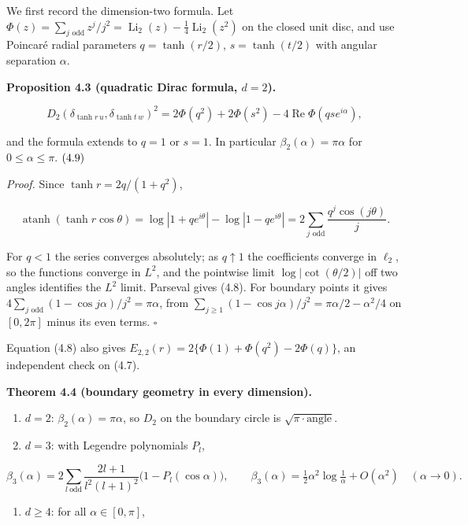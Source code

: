 \documentclass[
  british,
  11pt,
  a4paper,
]{article}
\providecommand{\tightlist}{%
  \setlength{\itemsep}{0pt}\setlength{\parskip}{0pt}}
\begin{document}
We first record the dimension-two formula. Let
\(\Phi(z)=\sum_{j\text{ odd}}z^j/j^2=\operatorname{Li}_2(z)-\tfrac14\operatorname{Li}_2(z^2)\)
on the closed unit disc, and use Poincaré radial parameters
\(q=\tanh(r/2)\), \(s=\tanh(t/2)\) with angular separation \(\alpha\).

\textbf{Proposition 4.3 (quadratic Dirac formula, \(d=2\)).}

\[
D_2(\delta_{\tanh r\,u},\delta_{\tanh t\,w})^2
=2\Phi(q^2)+2\Phi(s^2)-4\operatorname{Re}\Phi(qs e^{i\alpha}),
\tag{4.8}
\]

and the formula extends to \(q=1\) or \(s=1\). In particular
\(\beta_2(\alpha)=\pi\alpha\) for \(0\leq\alpha\leq\pi\).
\(\hfill(4.9)\)

\emph{Proof.} Since \(\tanh r=2q/(1+q^2)\),

\[
\operatorname{atanh}(\tanh r\cos\theta)
=\log|1+qe^{i\theta}|-\log|1-qe^{i\theta}|
=2\sum_{j\text{ odd}}\frac{q^j\cos(j\theta)}j.
\tag{4.10}
\]

For \(q<1\) the series converges absolutely; as \(q\uparrow1\) the
coefficients converge in \(\ell_2\), so the functions converge in
\(L^2\), and the pointwise limit \(\log|\cot(\theta/2)|\) off two angles
identifies the \(L^2\) limit. Parseval gives (4.8). For boundary points
it gives \(4\sum_{j\text{ odd}}(1-\cos j\alpha)/j^2=\pi\alpha\), from
\(\sum_{j\geq1}(1-\cos j\alpha)/j^2=\pi\alpha/2-\alpha^2/4\) on
\([0,2\pi]\) minus its even terms. \(\square\)

Equation (4.8) also gives
\(E_{2,2}(r)=2\{\Phi(1)+\Phi(q^2)-2\Phi(q)\}\), an independent check on
(4.7).

\textbf{Theorem 4.4 (boundary geometry in every dimension).}

\begin{enumerate}
\def\labelenumi{(\roman{enumi})}
\item
  \(d=2\): \(\beta_2(\alpha)=\pi\alpha\), so \(D_2\) on the boundary
  circle is \(\sqrt{\pi\cdot\text{angle}}\).
\item
  \(d=3\): with Legendre polynomials \(P_l\),
\end{enumerate}

\[
\beta_3(\alpha)=2\sum_{l\ \mathrm{odd}}\frac{2l+1}{l^2(l+1)^2}\bigl(1-P_l(\cos\alpha)\bigr),
\qquad
\beta_3(\alpha)=\tfrac12\alpha^2\log\tfrac1\alpha+O(\alpha^2)\quad(\alpha\to0).
\tag{4.11}
\]

\begin{enumerate}
\def\labelenumi{(\roman{enumi})}
\setcounter{enumi}{2}
\tightlist
\item
  \(d\geq4\): for all \(\alpha\in[0,\pi]\),
\end{enumerate}
\end{document}
